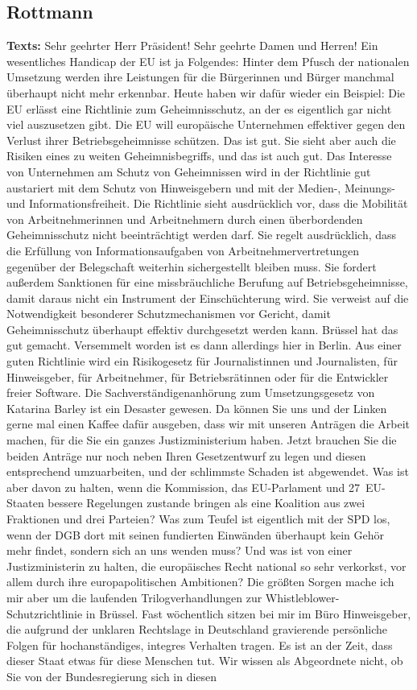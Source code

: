 \documentclass{article}
\begin{document}
\subsection{Rottmann}
\noindent\textbf{Texts:} Sehr geehrter Herr Präsident! Sehr geehrte Damen und Herren! Ein wesentliches Handicap der EU ist ja Folgendes: Hinter dem Pfusch der nationalen Umsetzung werden ihre Leistungen für die Bürgerinnen und Bürger manchmal überhaupt nicht mehr erkennbar. Heute haben wir dafür wieder ein Beispiel: Die EU erlässt eine Richtlinie zum Geheimnisschutz, an der es eigentlich gar nicht viel auszusetzen gibt. Die EU will europäische Unternehmen effektiver gegen den Verlust ihrer Betriebsgeheimnisse schützen. Das ist gut. Sie sieht aber auch die Risiken eines zu weiten Geheimnisbegriffs, und das ist auch gut. Das Interesse von Unternehmen am Schutz von Geheimnissen wird in der Richtlinie gut austariert mit dem Schutz von Hinweisgebern und mit der Medien-, Meinungs- und Informationsfreiheit. Die Richtlinie sieht ausdrücklich vor, dass die Mobilität von Arbeitnehmerinnen und Arbeitnehmern durch einen überbordenden Geheimnisschutz nicht beeinträchtigt werden darf. Sie regelt ausdrücklich, dass die Erfüllung von Informationsaufgaben von Arbeitnehmervertretungen gegenüber der Belegschaft weiterhin sichergestellt bleiben muss. Sie fordert außerdem Sanktionen für eine missbräuchliche Berufung auf Betriebsgeheimnisse, damit daraus nicht ein Instrument der Einschüchterung wird. Sie verweist auf die Notwendigkeit besonderer Schutzmechanismen vor Gericht, damit Geheimnisschutz überhaupt effektiv durchgesetzt werden kann. Brüssel hat das gut gemacht.  Versemmelt worden ist es dann allerdings hier in Berlin. Aus einer guten Richtlinie wird ein Risikogesetz für Journalistinnen und Journalisten, für Hinweisgeber, für Arbeitnehmer, für Betriebsrätinnen oder für die Entwickler freier Software. Die Sachverständigenanhörung zum Umsetzungsgesetz von Katarina Barley ist ein Desaster gewesen.  Da können Sie uns und der Linken gerne mal einen Kaffee dafür ausgeben, dass wir mit unseren Anträgen die Arbeit machen, für die Sie ein ganzes Justizministerium haben.  Jetzt brauchen Sie die beiden Anträge nur noch neben Ihren Gesetzentwurf zu legen und diesen entsprechend umzuarbeiten, und der schlimmste Schaden ist abgewendet. Was ist aber davon zu halten, wenn die Kommission, das EU-Parlament und 27 EU-Staaten bessere Regelungen zustande bringen als eine Koalition aus zwei Fraktionen und drei Parteien? Was zum Teufel ist eigentlich mit der SPD los, wenn der DGB dort mit seinen fundierten Einwänden überhaupt kein Gehör mehr findet, sondern sich an uns wenden muss?  Und was ist von einer Justizministerin zu halten, die europäisches Recht national so sehr verkorkst, vor allem durch ihre europapolitischen Ambitionen?  Die größten Sorgen mache ich mir aber um die laufenden Trilogverhandlungen zur Whistleblower-Schutzrichtlinie in Brüssel. Fast wöchentlich sitzen bei mir im Büro Hinweisgeber, die aufgrund der unklaren Rechtslage in Deutschland gravierende persönliche Folgen für hochanständiges, integres Verhalten tragen. Es ist an der Zeit, dass dieser Staat etwas für diese Menschen tut.  Wir wissen als Abgeordnete nicht, ob Sie von der Bundesregierung sich in diesen 
\end{document}
